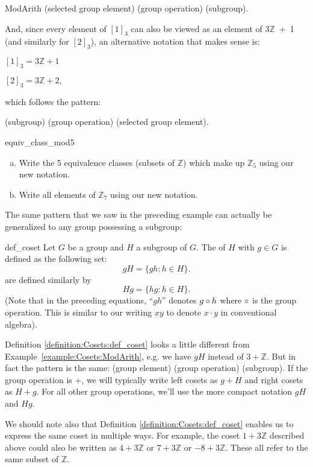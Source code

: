 \begin{example}{ModArith}
(selected group element) (group operation) (subgroup). 
\medskip

\noindent
And, since every element of  $[1]_3$ can also be viewed as an element of $3{\mathbb Z}$~+~1 (and similarly for $[2]_3$), an alternative notation that makes sense is:
\medskip

$[1]_3  =  3{\mathbb Z} + 1$

$[2]_3  = 3{\mathbb Z} + 2,$
\medskip

\noindent
which follows the pattern:
\medskip

(subgroup) (group operation) (selected group element).
\end{example}

\begin{exercise}{equiv_class_mod5}
\begin{enumerate}[(a)]
\item
Write the 5 equivalence classes (subsets of ${\mathbb Z}$)  which make up ${\mathbb Z}_5$ using our new notation.
\item
Write all elements of ${\mathbb Z}_7$ using our new notation.
\end{enumerate}
\end{exercise}

The same pattern that we saw in the preceding example can actually be generalized to any group possessing a subgroup:

\begin{defn}{def_coset}
Let $G$ be a group and $H$ a subgroup of $G$.  The  of $H$ with  $g \in G$ is defined as the following set: 
\[
gH = \{ gh : h \in H \}.
\]
 are defined similarly by
\[
Hg = \{ hg : h \in H \}.
\]
(Note that in the preceding equations, ``$gh$'' denotes $g \circ h$ where $\circ$ is the group operation. This is similar to our writing $xy$ to denote $x \cdot y$ in conventional algebra).
\end{defn}

Definition \ref{definition:Cosets:def_coset} looks a little different from Example~\ref{example:Cosets:ModArith}, e.g. we have $gH$ instead of  $3 + {\mathbb Z}$.  But in fact the pattern is the same:  (group element) (group operation) (subgroup).  If the group operation is +, we will typically write left cosets as $g + H$ and right cosets as $H + g$. For all other group operations, we'll use the more compact notation $gH$ and $Hg$.

We should note also that Definition \ref{definition:Cosets:def_coset} enables us to express the same coset in multiple ways. For example, the coset $1 + 3\mathbb{Z}$ described above could also be written as $4 + 3\mathbb{Z}$ or $7 + 3\mathbb{Z}$ or $-8 + 3\mathbb{Z}$. These all refer to the same subset of $\mathbb{Z}$.

